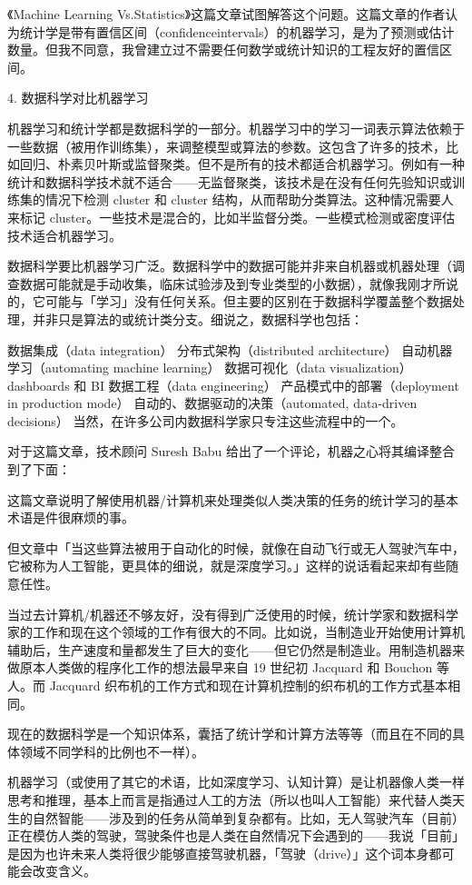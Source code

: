 \documentclass[10pt,a4paper]{ctexbook}
\begin{document}
《Machine Learning Vs.Statistics》这篇文章试图解答这个问题。这篇文章的作者认为统计学是带有置信区间（confidenceintervals）的机器学习，是为了预测或估计数量。但我不同意，我曾建立过不需要任何数学或统计知识的工程友好的置信区间。

4. 数据科学对比机器学习

机器学习和统计学都是数据科学的一部分。机器学习中的学习一词表示算法依赖于一些数据（被用作训练集），来调整模型或算法的参数。这包含了许多的技术，比如回归、朴素贝叶斯或监督聚类。但不是所有的技术都适合机器学习。例如有一种统计和数据科学技术就不适合——无监督聚类，该技术是在没有任何先验知识或训练集的情况下检测 cluster 和 cluster 结构，从而帮助分类算法。这种情况需要人来标记 cluster。一些技术是混合的，比如半监督分类。一些模式检测或密度评估技术适合机器学习。

数据科学要比机器学习广泛。数据科学中的数据可能并非来自机器或机器处理（调查数据可能就是手动收集，临床试验涉及到专业类型的小数据），就像我刚才所说的，它可能与「学习」没有任何关系。但主要的区别在于数据科学覆盖整个数据处理，并非只是算法的或统计类分支。细说之，数据科学也包括：

数据集成（data integration）
分布式架构（distributed architecture）
自动机器学习（automating machine learning）
数据可视化（data visualization）
dashboards 和 BI
数据工程（data engineering）
产品模式中的部署（deployment in production mode）
自动的、数据驱动的决策（automated, data-driven decisions）
当然，在许多公司内数据科学家只专注这些流程中的一个。

对于这篇文章，技术顾问 Suresh Babu 给出了一个评论，机器之心将其编译整合到了下面：

这篇文章说明了解使用机器/计算机来处理类似人类决策的任务的统计学习的基本术语是件很麻烦的事。

但文章中「当这些算法被用于自动化的时候，就像在自动飞行或无人驾驶汽车中，它被称为人工智能，更具体的细说，就是深度学习。」这样的说话看起来却有些随意任性。

当过去计算机/机器还不够友好，没有得到广泛使用的时候，统计学家和数据科学家的工作和现在这个领域的工作有很大的不同。比如说，当制造业开始使用计算机辅助后，生产速度和量都发生了巨大的变化——但它仍然是制造业。用制造机器来做原本人类做的程序化工作的想法最早来自 19 世纪初 Jacquard 和 Bouchon 等人。而 Jacquard 织布机的工作方式和现在计算机控制的织布机的工作方式基本相同。

现在的数据科学是一个知识体系，囊括了统计学和计算方法等等（而且在不同的具体领域不同学科的比例也不一样）。

机器学习（或使用了其它的术语，比如深度学习、认知计算）是让机器像人类一样思考和推理，基本上而言是指通过人工的方法（所以也叫人工智能）来代替人类天生的自然智能——涉及到的任务从简单到复杂都有。比如，无人驾驶汽车（目前）正在模仿人类的驾驶，驾驶条件也是人类在自然情况下会遇到的——我说「目前」是因为也许未来人类将很少能够直接驾驶机器，「驾驶（drive）」这个词本身都可能会改变含义。
\end{document}

